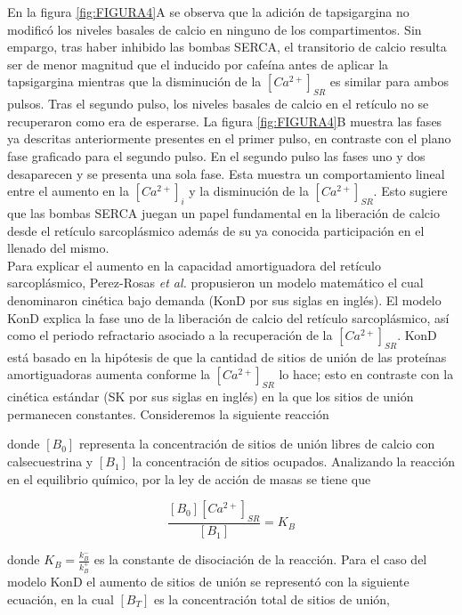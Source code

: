 \documentclass[draft]{article}
\newcommand{\Cai}{[Ca^{2+}]_{i}}
\newcommand{\Cal}{[Ca^{2+}]_{SR}}
\newcommand{\al}{\textit{et al.} }
\newcounter{reaction}
\newenvironment{reaction}{\refstepcounter{reaction}\equation}{\tag{\thereaction}\endequation}
\begin{document}
En la figura \ref{fig:FIGURA4}A se observa que la adición de tapsigargina no modificó los niveles basales de calcio en ninguno de los compartimentos. Sin empargo, tras haber inhibido las bombas SERCA, el transitorio de calcio resulta ser de menor magnitud que el inducido por cafeína antes de aplicar la tapsigargina mientras que la disminución de la $\Cal$ es similar para ambos pulsos. Tras el segundo pulso, los niveles basales de calcio en el retículo no se recuperaron como era de esperarse. La figura \ref{fig:FIGURA4}B muestra las fases ya descritas anteriormente presentes en el primer pulso, en contraste con el plano fase graficado para el segundo pulso. En el segundo pulso las fases uno y dos desaparecen y se presenta una sola fase. Esta muestra un comportamiento lineal entre el aumento en la $\Cai$ y la disminución de la $\Cal$. Esto sugiere que las bombas SERCA juegan un papel fundamental en la liberación de calcio desde el retículo sarcoplásmico además de su ya conocida participación en el llenado del mismo. \\

Para explicar el aumento en la capacidad amortiguadora del retículo sarcoplásmico, Perez-Rosas \al \cite{Perez-Rosas2015} propusieron un modelo matemático el cual denominaron cinética bajo demanda (KonD por sus siglas en inglés). El modelo KonD explica la fase uno de la liberación de calcio del retículo sarcoplásmico, así como el periodo refractario asociado a la recuperación de la $\Cal$. KonD está basado en la hipótesis de que la cantidad de sitios de unión de las proteínas amortiguadoras aumenta conforme la $\Cal$ lo hace; esto en contraste con la cinética estándar (SK por sus siglas en inglés) en la que los sitios de unión permanecen constantes. Consideremos la siguiente reacción

\begin{reaction}
\ce{{[B_0]} + {\Cal} <=>[k^{+}_B][k^{-}_B] {[B_1]}}
\end{reaction}

donde $[B_0]$ representa la concentración de sitios de unión libres de calcio con calsecuestrina y $[B_1]$ la concentración de sitios ocupados. Analizando la reacción en el equilibrio químico, por la ley de acción de masas se tiene que

\begin{equation}\label{BS}
\frac{[B_0][Ca^{2+}]_{SR}}{[B_1]}= K_B
\end{equation}

donde $K_B = \frac{k^{-}_B}{k^{+}_B}$ es la constante de disociación de la reacción. Para el caso del modelo KonD el aumento de sitios de unión se representó con la siguiente ecuación, en la cual $[B_T]$ es la concentración total de sitios de unión,
\end{document}
